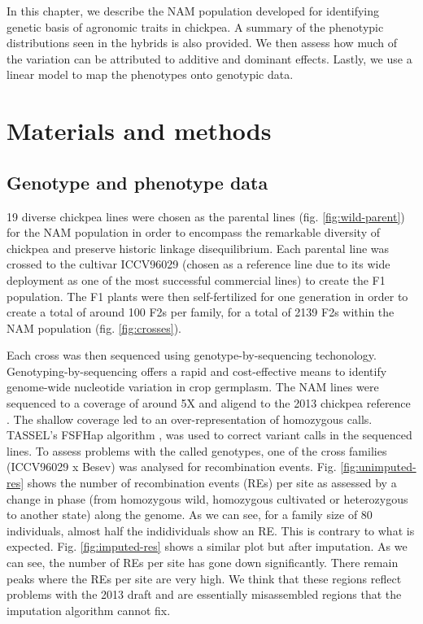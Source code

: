 
In this chapter, we describe the NAM population developed for identifying genetic basis of agronomic traits in chickpea. A summary of the phenotypic distributions seen in the hybrids is also provided. We then assess how much of the variation can be attributed to additive and dominant effects. Lastly, we use a linear model to map the phenotypes onto genotypic data. 

\section{Materials and methods}

\subsection{Genotype and phenotype data}

19 diverse chickpea lines were chosen as the parental lines (fig. \ref{fig:wild-parent}) for the NAM population in order to encompass the remarkable diversity of chickpea and preserve historic linkage disequilibrium. Each parental line was crossed to the cultivar ICCV96029 (chosen as a reference line due to its wide deployment as one of the most successful commercial lines) to create the F1 population. The F1 plants were then self-fertilized for one generation in order to create a total of around 100 F2s per family, for a total of 2139 F2s within the NAM population (fig. \ref{fig:crosses}).

Each cross was then sequenced using genotype-by-sequencing \cite{He2014} techonology. Genotyping-by-sequencing offers a rapid and cost-effective means to identify genome-wide nucleotide variation in crop germplasm. The NAM lines were sequenced to a coverage of around 5X and aligend to the 2013 chickpea reference \cite{Varshney2013}. The shallow coverage led to an over-representation of homozygous calls. TASSEL's FSFHap algorithm \cite{Swarts2014}, was used to correct variant calls in the sequenced lines. To assess problems with the called genotypes, one of the cross families (ICCV96029 x Besev) was analysed for recombination events. Fig. \ref{fig:unimputed-res} shows the number of recombination events (REs) per site as assessed by a change in phase (from homozygous wild, homozygous cultivated or heterozygous to another state) along the genome. As we can see, for a family size of 80 individuals, almost half the indidividuals show an RE. This is contrary to what is expected. Fig. \ref{fig:imputed-res} shows a similar plot but after imputation. As we can see, the number of REs per site has gone down significantly. There remain peaks where the REs per site are very high. We think that these regions reflect problems with the 2013 draft and are essentially misassembled regions that the imputation algorithm cannot fix. 

